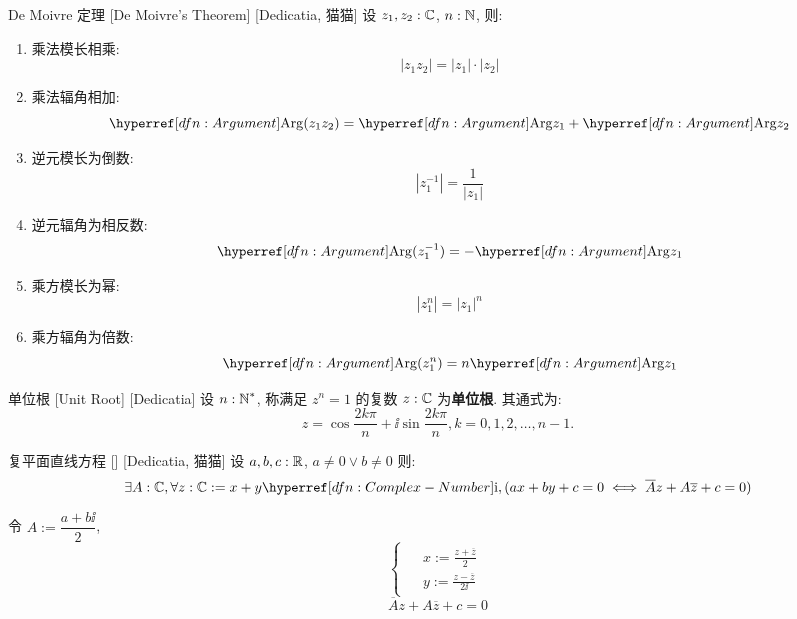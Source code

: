         \begin{thm}
            {De Moivre 定理}
            [De Moivre's Theorem]
            [Dedicatia, 猫猫]
            设 \(z_1,z_2:\operatorname{\mathbb{C}}\), \(n:\operatorname{\mathbb{N}}\), 则: 
            \begin{enumerate}
                \item 乘法模长相乘: 
                    \[|z_1 z_2|=|z_1|\cdot|z_2|\]
                \item 乘法辐角相加: 
                    \[\Arg(z_1 z_2)=\Arg z_1+\Arg z_2\]
                \item 逆元模长为倒数: 
                    \[|z_1^{-1}|=\frac{1}{|z_1|}\]
                \item 逆元辐角为相反数: 
                    \[\Arg(z_1^{-1})=-\Arg z_1\]
                \item 乘方模长为幂: 
                    \[|z_1^n|=|z_1|^n\]
                \item 乘方辐角为倍数: 
                    \[\Arg(z_1^n)=n\Arg z_1\]
            \end{enumerate}
        \end{thm}

        \begin{dfn}
            {单位根}
            [Unit Root]
            [Dedicatia]
            设 \(n:\operatorname{\mathbb{N}}^*\), 称满足 \(z^n=1\) 的复数 \(z:\operatorname{\mathbb{C}}\) 为\textbf{单位根}. 其通式为:
            \[z=\cos\dfrac{2k\pi}{n}+\ii\sin\dfrac{2k\pi}{n}, k=0,1,2,\dots,n-1.\]
        \end{dfn}

        \begin{thm}
            {复平面直线方程}
            []
            [Dedicatia, 猫猫]
            设 \(a,b,c:\operatorname{\mathbb{R}}\), \(a\neq 0\lor b\neq 0\) 则: 
            \[\exists A:\C, \forall z:\C:=x+y\ii, (ax+by+c=0\iff\overline{A}z+A\overline{z}+c=0)\]
        \end{thm}
        
        \begin{prf}
            令 \(A:=\dfrac{a+b\ii}{2}\), 
            \[
            \begin{cases}
            \begin{aligned}
                &x:=\frac{z+\overline{z}}{2}\\
                &y:=\frac{z-\overline{z}}{2\ii}
            \end{aligned}
            \end{cases}
            \]
            \[\overline{A}z+A\overline{z}+c=0\]
        \end{prf}


